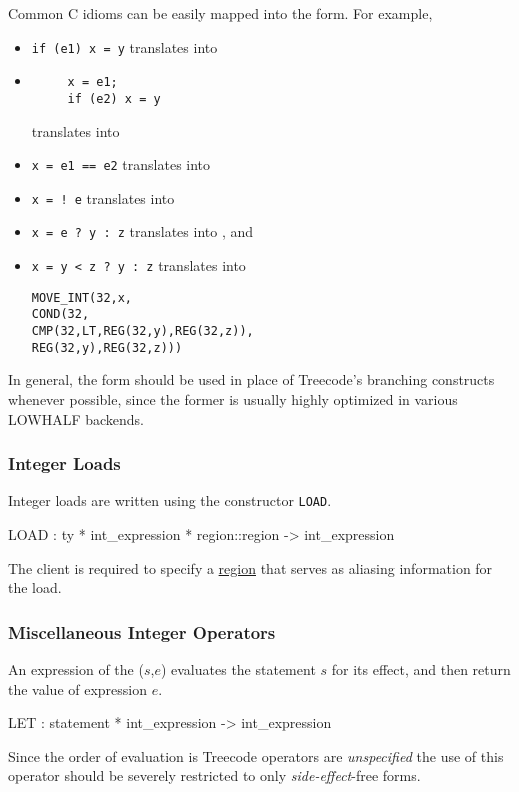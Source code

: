 Common C idioms can be easily mapped into the  form. For example,
\begin{itemize}
  \item \verb|if (e1) x = y| translates into
  \item
   \begin{verbatim}
     x = e1; 
     if (e2) x = y
   \end{verbatim}
    translates into 
  \item \verb|x = e1 == e2| translates into
  \item \verb|x = ! e| translates into
  \item \verb|x = e ? y : z| translates into
   , and
  \item \verb|x = y < z ? y : z| translates into
   \begin{alltt}
     MOVE_INT(32,x,
         COND(32,
            CMP(32,LT,REG(32,y),REG(32,z)),
               REG(32,y),REG(32,z)))
   \end{alltt} 
\end{itemize}

In general, the  form should be used in place of Treecode's branching
constructs whenever possible, since the former is usually highly 
optimized in various LOWHALF backends. 

\subsubsection{Integer Loads}

Integer loads are written using the constructor \verb|LOAD|.
\begin{SML}
   LOAD  : ty * int_expression * region::region -> int_expression
\end{SML}
The client is required to specify a \href{regions.html}{region} that
serves as aliasing information for the load.  

\subsubsection{Miscellaneous Integer Operators}

An expression of the ($s$,$e$) evaluates the statement $s$ for
its effect, and then return the value of expression $e$.
\begin{SML}
  LET  : statement * int_expression -> int_expression
\end{SML}
Since the order of evaluation is Treecode operators are 
\emph{unspecified}
the use of this operator should be severely restricted to only 
\emph{side-effect}-free forms.

